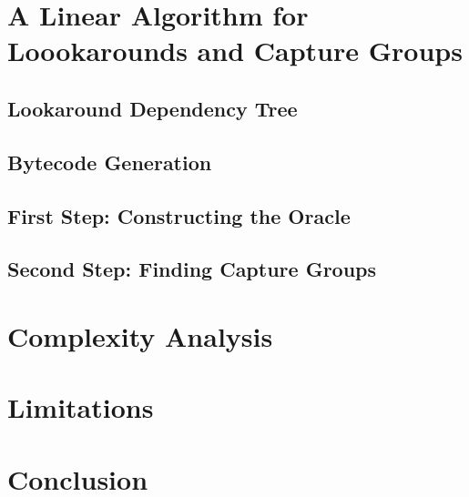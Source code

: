 \documentclass{article}
\begin{document}
\section{A Linear Algorithm for Loookarounds and Capture Groups}

\subsection{Lookaround Dependency Tree}

\subsection{Bytecode Generation}

\subsection{First Step: Constructing the Oracle}

\subsection{Second Step: Finding Capture Groups}

\section{Complexity Analysis}

\section{Limitations}

\section{Conclusion}



\newpage

\end{document}

